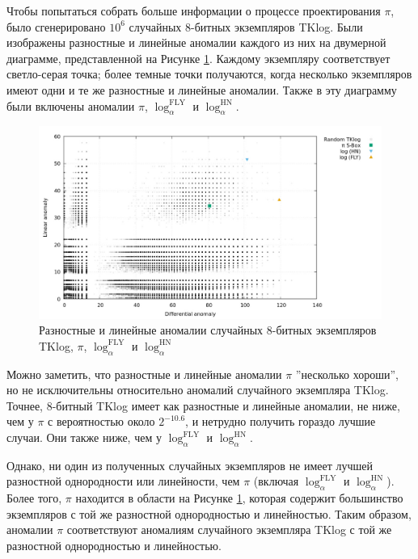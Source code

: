 Чтобы попытаться собрать больше информации о процессе проектирования \(\pi\), было сгенерировано \(10^6\) случайных 8-битных экземпляров TKlog. Были изображены разностные и линейные аномалии каждого из них на двумерной диаграмме, представленной на Рисунке \ref{fig:fig03}. Каждому экземпляру соответствует светло-серая точка; более темные точки получаются, когда несколько экземпляров имеют одни и те же разностные и линейные аномалии. Также в эту диаграмму были включены аномалии \(\pi\), \(\log^{\text{FLY}}_\alpha\) и \(\log^{\text{HN}}_\alpha\).

\begin{figure}
  \centering
  \includegraphics[scale=0.7]{contents/pics/anomalies.png}
  \caption{Разностные и линейные аномалии случайных 8-битных экземпляров TKlog, \(\pi\), \(\log^{\text{FLY}}_\alpha\) и \(\log^{\text{HN}}_\alpha\)}
  \label{fig:fig03}
\end{figure}

Можно заметить, что разностные и линейные аномалии \(\pi\) ''несколько хороши'', но не исключительны относительно аномалий случайного экземпляра TKlog. Точнее, 8-битный TKlog имеет как разностные и линейные аномалии, не ниже, чем у \(\pi\) с вероятностью около \(2^{-10.6}\), и нетрудно получить гораздо лучшие случаи. Они также ниже, чем у \(\log^{\text{FLY}}_\alpha\) и \(\log^{\text{HN}}_\alpha\).

Однако, ни один из полученных случайных экземпляров не имеет лучшей разностной однородности или линейности, чем \(\pi\) (включая \(\log^{\text{FLY}}_\alpha\) и \(\log^{\text{HN}}_\alpha\)). Более того, \(\pi\) находится в области на Рисунке \ref{fig:fig03}, которая содержит большинство экземпляров с той же разностной однородностью и линейностью. Таким образом, аномалии \(\pi\) соответствуют аномалиям случайного экземпляра TKlog с той же разностной однородностью и линейностью.

